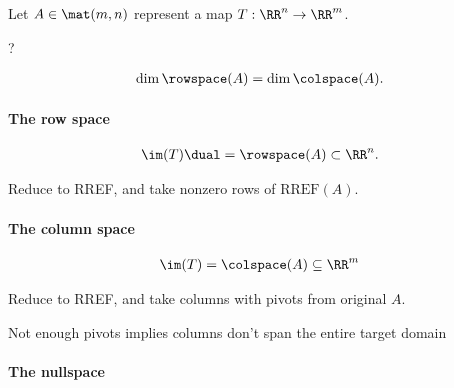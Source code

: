 Let \(A\in \mat(m, n)\) represent a map \(T:\RR^n\to \RR^m\).


\begin{definition}[Pivot]

?

\end{definition}


\begin{proposition}

\begin{align*}  
\dim \rowspace(A) = \dim \colspace(A)
.\end{align*}

\end{proposition}

\hypertarget{the-row-space}{%
\paragraph{The row space}\label{the-row-space}}

\begin{align*}
\im(T)\dual = \rowspace(A) \subset \RR^n
.\end{align*}

Reduce to RREF, and take nonzero rows of \(\mathrm{RREF}(A)\).

\hypertarget{the-column-space}{%
\paragraph{The column space}\label{the-column-space}}

\begin{align*}
\im(T) = \colspace(A) \subseteq \RR^m
\end{align*}

Reduce to RREF, and take columns with pivots from original \(A\).

\begin{remark}

Not enough pivots implies columns don't span the entire target domain

\end{remark}

\hypertarget{the-nullspace}{%
\paragraph{The nullspace}\label{the-nullspace}}

